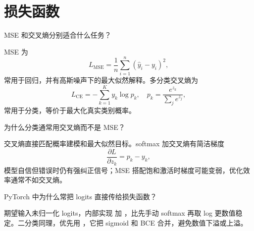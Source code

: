 \section{损失函数}
\begin{interview}
MSE 和交叉熵分别适合什么任务？
\end{interview}
\begin{answer}
MSE 为
\[
L_{\mathrm{MSE}}=\frac{1}{n}\sum_{i=1}^{n}(\hat{y}_i-y_i)^2,
\]
常用于回归，并有高斯噪声下的最大似然解释。多分类交叉熵为
\[
L_{\mathrm{CE}}=-\sum_{k=1}^{K}y_k\log p_k,
\quad
p_k=\frac{e^{z_k}}{\sum_j e^{z_j}},
\]
常用于分类，等价于最大化真实类别概率。
\end{answer}
\begin{interview}
为什么分类通常用交叉熵而不是 MSE？
\end{interview}
\begin{answer}
交叉熵直接匹配概率建模和最大似然目标。softmax 加交叉熵有简洁梯度
\[
\frac{\partial L}{\partial z_k}=p_k-y_k,
\]
模型自信但错误时仍有强纠正信号；MSE 搭配饱和激活时梯度可能变弱，优化效率通常不如交叉熵。
\end{answer}
\begin{interview}
PyTorch 中为什么常把 logits 直接传给损失函数？
\end{interview}
\begin{answer}
 期望输入未归一化 logits，内部实现  加 ，比先手动 softmax 再取 log 更数值稳定。二分类同理，优先用 ，它把 sigmoid 和 BCE 合并，避免数值下溢或上溢。
\end{answer}
